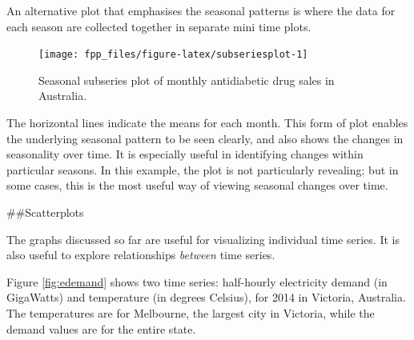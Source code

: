 \documentclass[]{book}
\newenvironment{Shaded}{\begin{snugshade}}{\end{snugshade}}
\newcommand{\KeywordTok}[1]{\textcolor[rgb]{0.13,0.29,0.53}{\textbf{#1}}}
\newcommand{\NormalTok}[1]{#1}
\newcommand{\OperatorTok}[1]{\textcolor[rgb]{0.81,0.36,0.00}{\textbf{#1}}}
\newcommand{\StringTok}[1]{\textcolor[rgb]{0.31,0.60,0.02}{#1}}
\begin{document}
An alternative plot that emphasises the seasonal patterns is where the data for each season are collected together in separate mini time plots.

\begin{Shaded}
\end{Shaded}

\begin{figure}

{\centering \texttt{[image: fpp\_files/figure-latex/subseriesplot-1]} 

}

\caption{Seasonal subseries plot of monthly antidiabetic drug sales in Australia.}\label{fig:subseriesplot}
\end{figure}

The horizontal lines indicate the means for each month. This form of plot enables the underlying seasonal pattern to be seen clearly, and also shows the changes in seasonality over time. It is especially useful in identifying changes within particular seasons. In this example, the plot is not particularly revealing; but in some cases, this is the most useful way of viewing seasonal changes over time.

\#\#Scatterplots

The graphs discussed so far are useful for visualizing individual time series. It is also useful to explore relationships \emph{between} time series.

Figure \ref{fig:edemand} shows two time series: half-hourly electricity demand (in GigaWatts) and temperature (in degrees Celsius), for 2014 in Victoria, Australia. The temperatures are for Melbourne, the largest city in Victoria, while the demand values are for the entire state.
\end{document}
